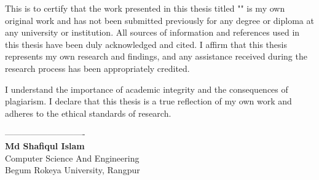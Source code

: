 \newpage
{}

This is to certify that the work presented in this thesis titled "\textbf{\projectTitle}" is my own original work and has not been submitted previously for any degree or diploma at any university or institution.
All sources of information and references used in this thesis have been duly acknowledged and cited. I affirm that this thesis represents my own research and findings, and any assistance received during the research process has been appropriately credited.

I understand the importance of academic integrity and the consequences of plagiarism. I declare that this thesis is a true reflection of my own work and adheres to the ethical standards of research.
\vspace{2cm}
\begin{flushright}
    ----------------------------\\
    \textbf{Md Shafiqul Islam}\\
    Computer Science And Engineering\\
    Begum Rokeya University, Rangpur\\
\end{flushright}